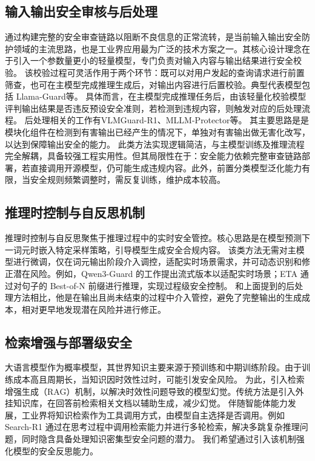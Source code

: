 \subsection{输入输出安全审核与后处理}
通过构建完整的安全审查链路以阻断不良信息的正常流转，是当前输入输出安全防护领域的主流思路，也是工业界应用最为广泛的技术方案之一。其核心设计理念在于引入一个参数量更小的轻量模型，专门负责对输入内容与输出结果进行安全校验。
该校验过程可灵活作用于两个环节：既可以对用户发起的查询请求进行前置筛查，也可在主模型完成推理生成后，对输出内容进行后置校验。典型代表模型包括 Llama-Guard\supercite{Inan2023LlamaGL,Helff2024LLavaGuardVS,DBLP:journals/corr/abs-2407-21772,DBLP:journals/corr/abs-2510-14276,DBLP:conf/nips/HanREJL00D24}等。
具体而言，在主模型完成推理任务后，由该轻量化校验模型评判输出结果是否违反预设安全准则，若检测到违规内容，则触发对应的后处理流程。
后处理相关的工作有VLMGuard-R1、MLLM-Protector等\supercite{Wang2024MLLMasaJudgeFI, DBLP:journals/corr/abs-2504-10081}。
其主要思路是\supercite{Wang2024MLLMasaJudgeFI}是模块化组件在检测到有害输出已经产生的情况下，单独对有害输出做无害化改写，以达到保障输出安全的能力。
此类方法实现逻辑简洁，与主模型训练及推理流程完全解耦，具备较强工程实用性。但其局限性在于：安全能力依赖完整审查链路部署，若直接调用开源模型，仍可能生成违规内容。此外，前置分类模型泛化能力有限，当安全规则频繁调整时，需反复训练，维护成本较高。

\subsection{推理时控制与自反思机制}

推理时控制与自反思聚焦于推理过程中的实时安全管控。核心思路是在模型预测下一词元时嵌入特定采样策略，引导模型生成安全合规内容。
该类方法无需对主模型进行微调，仅在词元输出阶段介入调控，适配实时场景需求，并可动态识别和修正潜在风险。例如，Qwen3-Guard \supercite{DBLP:journals/corr/abs-2510-14276}的工作提出流式版本以适配实时场景；ETA 通过对句子的 Best-of-N 前缀进行推理，实现过程级安全控制\supercite{DBLP:conf/iclr/DingLZ25}。
和上面提到的后处理方法相比，他是在输出且尚未结束的过程中介入管控，避免了完整输出的生成成本，相对更早地发现潜在风险并进行修正。

\subsection{检索增强与部署级安全}

大语言模型作为概率模型，其世界知识主要来源于预训练和中期训练阶段。由于训练成本高且周期长，当知识因时效性过时，可能引发安全风险。
为此，引入检索增强生成（RAG）机制，以解决时效性问题导致的模型幻觉。传统方法是引入外挂知识库，在回答前检索相关文档以辅助生成，减少幻觉。
伴随智能体能力发展，工业界将知识检索作为工具调用方式，由模型自主选择是否调用。例如 Search-R1 通过在思考过程中调用检索能力并进行多轮检索，解决多跳复杂推理问题，同时隐含具备处理知识密集型安全问题的潜力。
我们希望通过引入该机制强化模型的安全反思能力。

